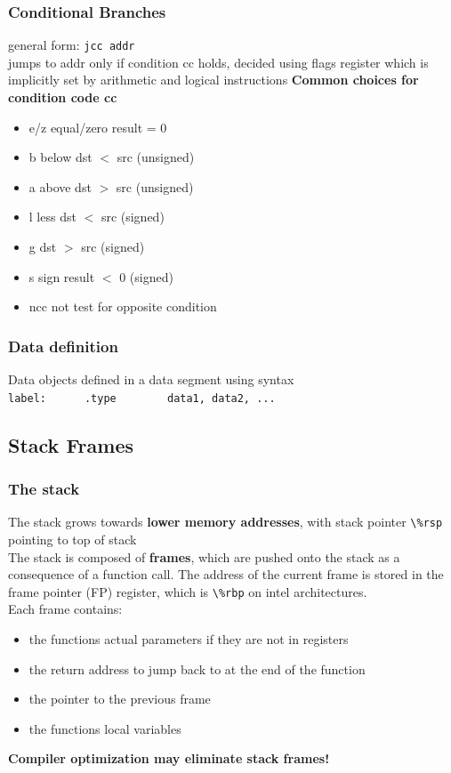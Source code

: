 \documentclass{article}
\begin{document}
\subsubsection{Conditional Branches}
general form: \verb|jcc addr|
\\jumps to addr only if condition cc holds, decided using flags register which is implicitly set by arithmetic and logical instructions
\textbf{Common choices for condition code cc}
\begin{itemize}
    \item e/z equal/zero result = 0
    \item b below dst $<$ src (unsigned)
    \item a above dst $>$ src (unsigned)
    \item l less dst $<$ src (signed)
    \item g dst $>$ src (signed)
    \item s sign result $<$ 0 (signed)
    \item ncc not test for opposite condition
\end{itemize}
\subsubsection{Data definition}
Data objects defined in a data segment using syntax
\\\verb|label:      .type        data1, data2, ...|

\subsection{Stack Frames}
\subsubsection{The stack}
The stack grows towards \textbf{lower memory addresses}, with stack pointer \verb|\%rsp| pointing to top of stack
\\The stack is composed of \textbf{frames}, which are pushed onto the stack as a consequence of a function call. The address of the current frame is stored in the frame pointer (FP) register, which is \verb|\%rbp| on intel architectures.
\\Each frame contains:
\begin{itemize}
    \item the functions actual parameters if they are not in registers
    \item the return address to jump back to at the end of the function
    \item the pointer to the previous frame
    \item the functions local variables
\end{itemize}
\textbf{Compiler optimization may eliminate stack frames!}
\end{document}
